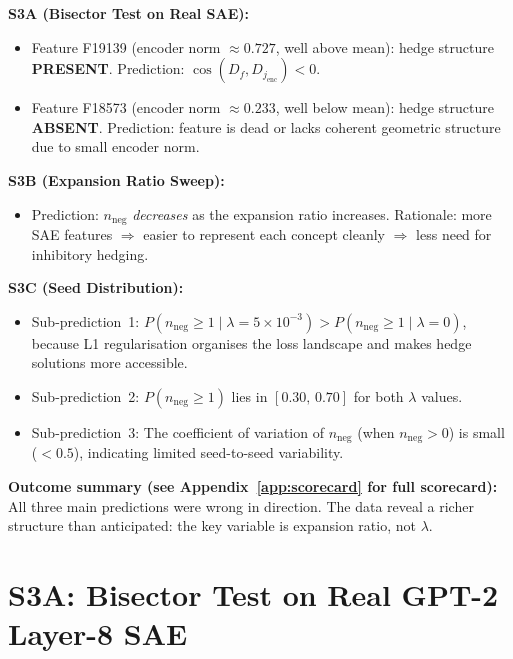 \documentclass[11pt,a4paper]{article}
\newcommand{\nneg}{n_{\mathrm{neg}}}
\newcommand{\Df}{D_f}
\newcommand{\jenc}{j_{\mathrm{enc}}}
\begin{document}
\begin{prereg}
\textbf{S3A (Bisector Test on Real SAE):}
\begin{itemize}[noitemsep]
  \item Feature F19139 (encoder norm ${\approx}0.727$, well above mean): hedge
    structure \textbf{PRESENT}.  Prediction: $\cos(\Df, D_{\jenc}) < 0$.
  \item Feature F18573 (encoder norm ${\approx}0.233$, well below mean): hedge
    structure \textbf{ABSENT}.  Prediction: feature is dead or lacks coherent
    geometric structure due to small encoder norm.
\end{itemize}

\textbf{S3B (Expansion Ratio Sweep):}
\begin{itemize}[noitemsep]
  \item Prediction: $\nneg$ \emph{decreases} as the expansion ratio increases.
    Rationale: more SAE features $\Rightarrow$ easier to represent each concept
    cleanly $\Rightarrow$ less need for inhibitory hedging.
\end{itemize}

\textbf{S3C (Seed Distribution):}
\begin{itemize}[noitemsep]
  \item Sub-prediction~1: $P(\nneg{\ge}1 \mid \lambda{=}5\times10^{-3}) >
    P(\nneg{\ge}1 \mid \lambda{=}0)$, because L1 regularisation organises the
    loss landscape and makes hedge solutions more accessible.
  \item Sub-prediction~2: $P(\nneg{\ge}1)$ lies in $[0.30,\,0.70]$ for both
    $\lambda$ values.
  \item Sub-prediction~3: The coefficient of variation of $\nneg$ (when $\nneg>0$)
    is small ($<0.5$), indicating limited seed-to-seed variability.
\end{itemize}
\end{prereg}

\textbf{Outcome summary (see Appendix~\ref{app:scorecard} for full scorecard):}
All three main predictions were wrong in direction.  The data reveal a richer
structure than anticipated: the key variable is expansion ratio, not $\lambda$.

\section{S3A: Bisector Test on Real GPT-2 Layer-8 SAE}
\label{sec:s3a}
\end{document}
